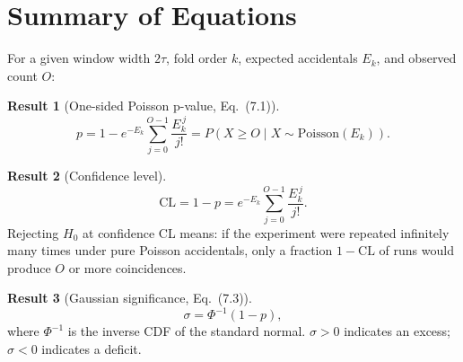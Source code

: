 \documentclass[12pt]{article}
\theoremstyle{definition}
\newtheorem{result}{Result}
\theoremstyle{remark}
\newcommand{\Prob}[1]{P\!\left(#1\right)}
\newcommand{\Ho}{H_0}
\newcommand{\obs}{O}
\newcommand{\Eacc}{E}
\newcommand{\nsig}{\sigma}
\begin{document}
\section{Summary of Equations}
\label{sec:summary}

For a given window width $2\tau$, fold order $k$, expected accidentals
$\Eacc_k$, and observed count $\obs$:

\begin{result}[One-sided Poisson p-value, Eq.~(7.1)]
  \[
    p = 1 - e^{-\Eacc_k}\sum_{j=0}^{\obs-1}\frac{\Eacc_k^{\,j}}{j!}
    = \Prob{X \ge \obs \mid X\sim\mathrm{Poisson}(\Eacc_k)}.
  \]
\end{result}

\begin{result}[Confidence level]
  \[
    \text{CL} = 1 - p = e^{-\Eacc_k}\sum_{j=0}^{\obs-1}
    \frac{\Eacc_k^{\,j}}{j!}.
  \]
  Rejecting $\Ho$ at confidence CL means: if the experiment were
  repeated infinitely many times under pure Poisson accidentals, only a
  fraction $1 - \text{CL}$ of runs would produce $\obs$ or more
  coincidences.
\end{result}

\begin{result}[Gaussian significance, Eq.~(7.3)]
  \[
    \nsig = \Phi^{-1}(1 - p),
  \]
  where $\Phi^{-1}$ is the inverse CDF of the standard normal.
  $\nsig > 0$ indicates an excess; $\nsig < 0$ indicates a deficit.
\end{result}
\end{document}
